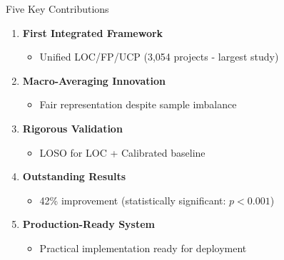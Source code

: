 \documentclass[aspectratio=169]{beamer}
\begin{document}
\begin{frame}{Five Key Contributions}
\begin{enumerate}
    \item \textbf{First Integrated Framework}
    \begin{itemize}
        \item Unified LOC/FP/UCP (3,054 projects - largest study)
    \end{itemize}
    
    \vspace{0.15cm}
    \item \textbf{Macro-Averaging Innovation}
    \begin{itemize}
        \item Fair representation despite sample imbalance
    \end{itemize}
    
    \vspace{0.15cm}
    \item \textbf{Rigorous Validation}
    \begin{itemize}
        \item LOSO for LOC + Calibrated baseline
    \end{itemize}
    
    \vspace{0.15cm}
    \item \textbf{Outstanding Results}
    \begin{itemize}
        \item 42\% improvement (statistically significant: $p < 0.001$)
    \end{itemize}
    
    \vspace{0.15cm}
    \item \textbf{Production-Ready System}
    \begin{itemize}
        \item Practical implementation ready for deployment
    \end{itemize}
\end{enumerate}
\end{frame}
\end{document}
